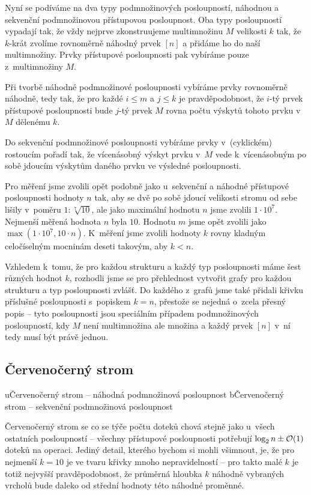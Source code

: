 Nyní se podíváme na dva typy podmnožinových posloupností, náhodnou a sekvenční
podmnožinovou přístupovou posloupnost. Oba typy posloupností vypadají tak, že
vždy nejprve zkonstruujeme multimnožinu $M$ velikosti $k$ tak, že $k$-krát
zvolíme rovnoměrně náhodný prvek $[n]$ a přidáme ho do naší multimnožiny. Prvky
přístupové posloupnosti pak vybíráme pouze z~multimnožiny $M$. 

Při tvorbě
náhodné podmnožinové posloupnosti vybíráme prvky rovnoměrně náhodně, tedy tak, že pro každé
$i\leq m$ a $j\leq k$ je pravděpodobnost, že $i$-tý prvek přístupové
posloupnosti bude $j$-tý prvek $M$ rovna počtu výskytů tohoto prvku v~$M$
dělenému $k$.

Do sekvenční podmnožinové posloupnosti vybíráme prvky v~(cyklickém) rostoucím pořadí tak, že vícenásobný výskyt prvku v~$M$ vede k~vícenásobným po sobě jdoucím výskytům daného prvku ve výsledné posloupnosti. 

Pro měření jsme zvolili opět podobně jako u~sekvenční a náhodné přístupové
posloupnosti hodnoty $n$ tak, aby se dvě po sobě jdoucí velikosti stromu od
sebe lišily v~poměru $1:\sqrt[7]{10}$, ale jako maximální hodnotu $n$ jsme
zvolili $1\cdot10^7$. Nejmenší měřená hodnota $n$ byla $10$. Hodnotu $m$ jsme
opět zvolili jako $\max(1\cdot10^7, 10\cdot n)$. K~měření jsme zvolili hodnoty
$k$ rovny kladným celočíselným mocninám deseti takovým, aby $k<n$.

Vzhledem k~tomu, že pro každou strukturu a každý typ posloupnosti máme šest
různých hodnot $k$, rozhodli jsme se pro přehlednost vytvořit grafy pro každou
strukturu a typ posloupnosti zvlášť. Do každého z~grafů jsme také přidali
křivku příslušné  posloupnosti s~popiskem $k=n$, přestože se
nejedná o~zcela přesný popis -- tyto posloupnosti jsou speciálním případem
podmnožinových posloupností, kdy $M$ není multimnožina ale množina a každý
prvek $[n]$ v~ní tedy musí být právě jednou.

\subsection{Červenočerný strom}

u{Červenočerný strom -- náhodná podmnožinová posloupnost}
b{Červenočerný strom -- sekvenční podmnožinová posloupnost}

Červenočerný strom se co se týče počtu doteků chová stejně jako u~všech
ostatních posloupností -- všechny přístupové posloupnosti potřebují $\log n \pm
\o(1)$ doteků na operaci. Jediný detail, kterého bychom si mohli všimnout, je,
že pro nejmenší $k=10$ je ve tvaru křivky mnoho nepravidelností -- pro takto
malé $k$ je totiž nejvyšší pravděpodobnost, že průměrná hloubka $k$ náhodně
vybraných vrcholů bude daleko od střední hodnoty této náhodné proměnné. 

